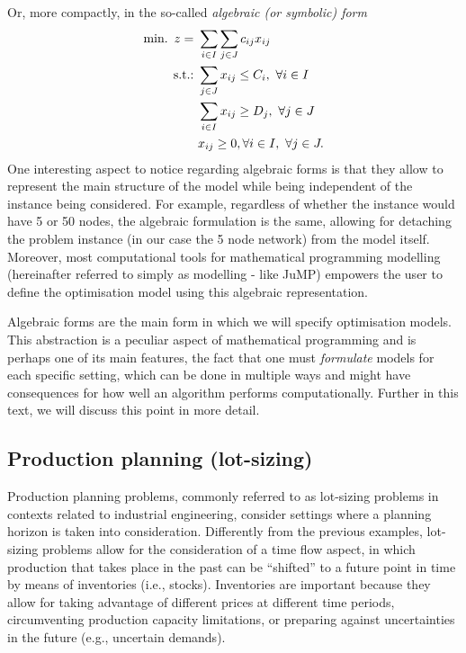 Or, more compactly, in the so-called \emph{algebraic (or symbolic) form}
%
\begin{align*}
	\mathop{\text{min.~}} z = \ &\sum_{i \in I}\sum_{j \in J}c_{ij}x_{ij} \\
	\mathop{\text{s.t.:~}} & \sum_{j \in J} x_{ij} \leq C_i, ~\forall i \in I \\
	& \sum_{i \in I} x_{ij} \geq D_j, ~\forall j \in J \\
	&x_{ij} \geq 0, \forall i \in I, ~\forall j \in J.
\end{align*}
%
One interesting aspect to notice regarding algebraic forms is that they allow to represent the main structure of the model while being independent of the instance being considered. For example, regardless of whether the instance would have 5 or 50 nodes, the algebraic formulation is the same, allowing for detaching the problem instance (in our case the 5 node network) from the model itself. Moreover, most computational tools for mathematical programming modelling (hereinafter referred to simply as modelling - like JuMP) empowers the user to define the optimisation model using this algebraic representation.

Algebraic forms are the main form in which we will specify optimisation models. This abstraction is a peculiar aspect of mathematical programming and is perhaps one of its main features, the fact that one must \emph{formulate} models for each specific setting, which can be done in multiple ways and might have consequences for how well an algorithm performs computationally. Further in this text, we will discuss this point in more detail.  


\subsection{Production planning (lot-sizing)}

Production planning problems, commonly referred to as lot-sizing problems in contexts related to industrial engineering, consider settings where a planning horizon is taken into consideration. Differently from the previous examples, lot-sizing problems allow for the consideration of a time flow aspect, in which production that takes place in the past can be ``shifted'' to a future point in time by means of inventories (i.e., stocks). Inventories are important because they allow for taking advantage of different prices at different time periods, circumventing production capacity limitations, or preparing against uncertainties in the future (e.g., uncertain demands).


